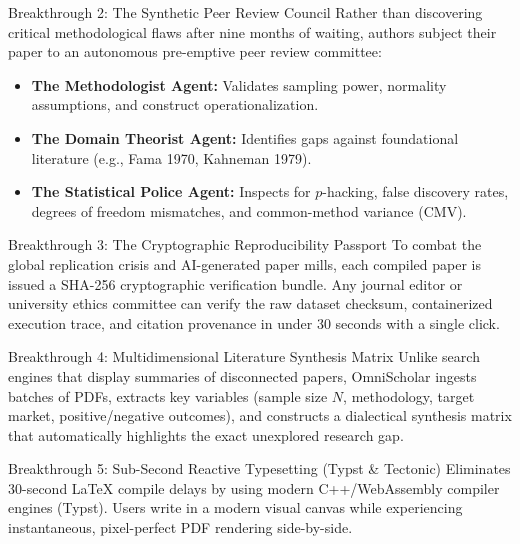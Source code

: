 \documentclass[11pt,a4paper]{article}
\begin{document}
\begin{breakthroughbox}{Breakthrough 2: The Synthetic Peer Review Council}
Rather than discovering critical methodological flaws after nine months of waiting, authors subject their paper to an autonomous pre-emptive peer review committee:
\begin{itemize}
    \item \textbf{The Methodologist Agent:} Validates sampling power, normality assumptions, and construct operationalization.
    \item \textbf{The Domain Theorist Agent:} Identifies gaps against foundational literature (e.g., Fama 1970, Kahneman 1979).
    \item \textbf{The Statistical Police Agent:} Inspects for $p$-hacking, false discovery rates, degrees of freedom mismatches, and common-method variance (CMV).
\end{itemize}
\end{breakthroughbox}

\begin{breakthroughbox}{Breakthrough 3: The Cryptographic Reproducibility Passport}
To combat the global replication crisis and AI-generated paper mills, each compiled paper is issued a SHA-256 cryptographic verification bundle. Any journal editor or university ethics committee can verify the raw dataset checksum, containerized execution trace, and citation provenance in under 30 seconds with a single click.
\end{breakthroughbox}

\begin{breakthroughbox}{Breakthrough 4: Multidimensional Literature Synthesis Matrix}
Unlike search engines that display summaries of disconnected papers, OmniScholar ingests batches of PDFs, extracts key variables (sample size $N$, methodology, target market, positive/negative outcomes), and constructs a dialectical synthesis matrix that automatically highlights the exact unexplored research gap.
\end{breakthroughbox}

\begin{breakthroughbox}{Breakthrough 5: Sub-Second Reactive Typesetting (Typst \& Tectonic)}
Eliminates 30-second LaTeX compile delays by using modern C++/WebAssembly compiler engines (Typst). Users write in a modern visual canvas while experiencing instantaneous, pixel-perfect PDF rendering side-by-side.
\end{breakthroughbox}

\newpage
\end{document}
